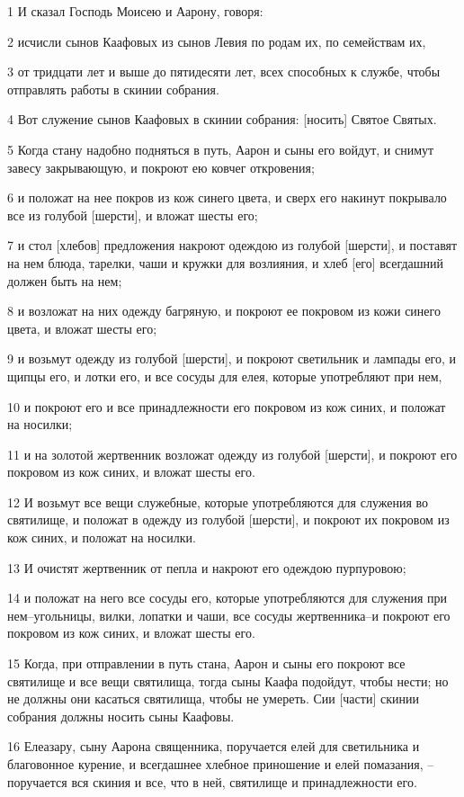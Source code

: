 \par 1 И сказал Господь Моисею и Аарону, говоря:
\par 2 исчисли сынов Каафовых из сынов Левия по родам их, по семействам их,
\par 3 от тридцати лет и выше до пятидесяти лет, всех способных к службе, чтобы отправлять работы в скинии собрания.
\par 4 Вот служение сынов Каафовых в скинии собрания: [носить] Святое Святых.
\par 5 Когда стану надобно подняться в путь, Аарон и сыны его войдут, и снимут завесу закрывающую, и покроют ею ковчег откровения;
\par 6 и положат на нее покров из кож синего цвета, и сверх его накинут покрывало все из голубой [шерсти], и вложат шесты его;
\par 7 и стол [хлебов] предложения накроют одеждою из голубой [шерсти], и поставят на нем блюда, тарелки, чаши и кружки для возлияния, и хлеб [его] всегдашний должен быть на нем;
\par 8 и возложат на них одежду багряную, и покроют ее покровом из кожи синего цвета, и вложат шесты его;
\par 9 и возьмут одежду из голубой [шерсти], и покроют светильник и лампады его, и щипцы его, и лотки его, и все сосуды для елея, которые употребляют при нем,
\par 10 и покроют его и все принадлежности его покровом из кож синих, и положат на носилки;
\par 11 и на золотой жертвенник возложат одежду из голубой [шерсти], и покроют его покровом из кож синих, и вложат шесты его.
\par 12 И возьмут все вещи служебные, которые употребляются для служения во святилище, и положат в одежду из голубой [шерсти], и покроют их покровом из кож синих, и положат на носилки.
\par 13 И очистят жертвенник от пепла и накроют его одеждою пурпуровою;
\par 14 и положат на него все сосуды его, которые употребляются для служения при нем--угольницы, вилки, лопатки и чаши, все сосуды жертвенника--и покроют его покровом из кож синих, и вложат шесты его.
\par 15 Когда, при отправлении в путь стана, Аарон и сыны его покроют все святилище и все вещи святилища, тогда сыны Каафа подойдут, чтобы нести; но не должны они касаться святилища, чтобы не умереть. Сии [части] скинии собрания должны носить сыны Каафовы.
\par 16 Елеазару, сыну Аарона священника, поручается елей для светильника и благовонное курение, и всегдашнее хлебное приношение и елей помазания, --поручается вся скиния и все, что в ней, святилище и принадлежности его.

